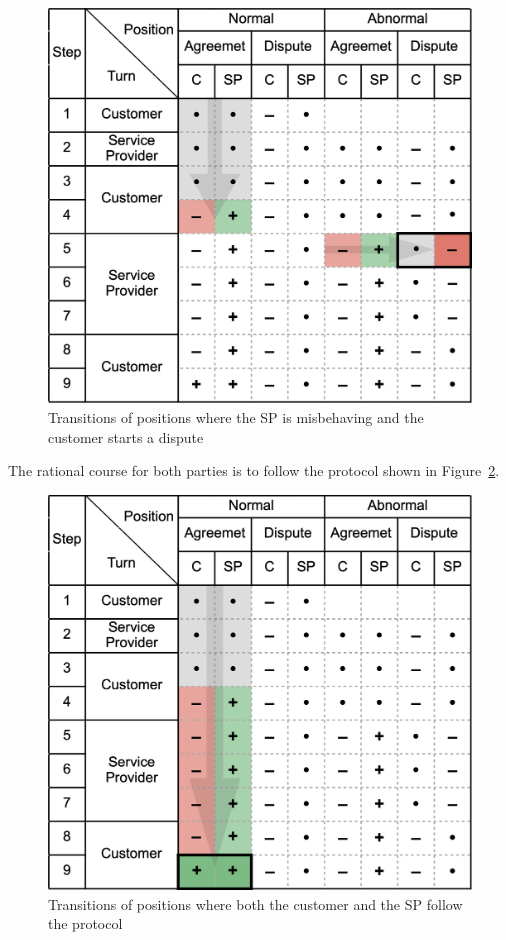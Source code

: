 \documentclass[pdftex,twocolumn,epjc3]{svjour3}
\begin{document}
{\begin{figure}[h!]
\includegraphics[width=\linewidth]{misbehaviour.png}
\centering
\caption{Transitions of positions where the SP is misbehaving and the customer starts a dispute}
\label{fig:misbehaviour}
\end{figure}

The rational course for both parties is to follow the protocol shown in Figure~\ref{fig:rational}.

\begin{figure}[h!]
\includegraphics[width=\linewidth]{rational.png}
\centering
\caption{Transitions of positions where both the customer and the SP follow the protocol}
\label{fig:rational}
\end{figure}

}
\end{document}
